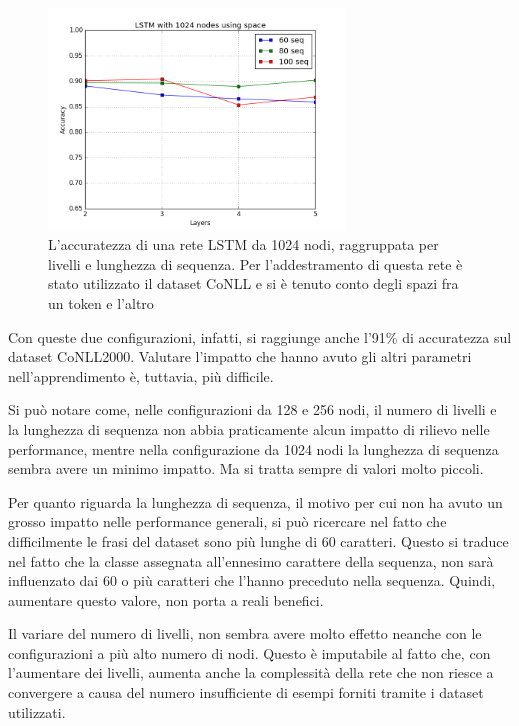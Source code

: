 \begin{figure}[H]
  \centering
  \begin{center}
    \includegraphics[width=0.7\textwidth]{./images/plots/english/accuracy_1024n_word_min_loss_using_spaces.png}
  \end{center}
  \caption{L'accuratezza di una rete LSTM da 1024 nodi, raggruppata per livelli e
          lunghezza di sequenza. Per l'addestramento di questa rete \`e stato
          utilizzato il dataset CoNLL e si \`e tenuto conto degli spazi fra un
          token e l'altro}
  \label{fig:accEng1024sp}
\end{figure}

Con queste due configurazioni, infatti, si raggiunge anche l'91\% di accuratezza
sul dataset CoNLL2000. Valutare l'impatto che hanno avuto gli altri parametri
nell'apprendimento \`e, tuttavia, pi\`u difficile.

Si pu\`o notare come, nelle configurazioni da 128 e 256 nodi, il numero di livelli
e la lunghezza di sequenza non abbia praticamente alcun impatto di rilievo nelle
performance, mentre nella configurazione da 1024 nodi la lunghezza di sequenza
sembra avere un minimo impatto. Ma si tratta sempre di valori molto piccoli.

Per quanto riguarda la lunghezza di sequenza, il motivo per cui non ha avuto un
grosso impatto nelle performance generali, si pu\`o ricercare nel fatto che
difficilmente le frasi del dataset sono pi\`u lunghe di 60 caratteri. Questo si
traduce nel fatto che la classe assegnata all'ennesimo carattere della sequenza,
non sar\`a influenzato dai 60 o pi\`u caratteri che l'hanno preceduto nella
sequenza. Quindi, aumentare questo valore, non porta a reali benefici.

Il variare del numero di livelli, non sembra avere molto effetto neanche con le
configurazioni a pi\`u alto numero di nodi. Questo \`e imputabile al fatto che,
con l'aumentare dei livelli, aumenta anche la complessit\`a della rete che non
riesce a convergere a causa del numero insufficiente di esempi forniti tramite
i dataset utilizzati.

